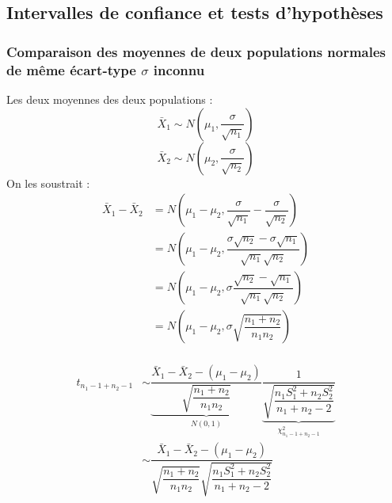 \subsection{Intervalles de confiance et tests d'hypothèses}

\subsubsection{Comparaison des moyennes de deux populations normales de même écart-type $\sigma$ inconnu}
Les deux moyennes des deux populations :
$$\bar{X}_1 \sim N \left( \mu_1, \dfrac{\sigma}{\sqrt{n_1}} \right)$$
$$\bar{X}_2 \sim N \left( \mu_2, \dfrac{\sigma}{\sqrt{n_2}} \right)$$
On les soustrait :
\begin{align*}
\bar{X}_1 - \bar{X}_2 &= N \left( \mu_1 - \mu_2, \dfrac{\sigma}{\sqrt{n_1}} - \dfrac{\sigma}{\sqrt{n_2}} \right)\\
                      &= N \left( \mu_1 - \mu_2, \dfrac{\sigma\sqrt{n_2} - \sigma\sqrt{n_1}}{\sqrt{n_1}\sqrt{n_2}} \right)\\
                      &= N \left( \mu_1 - \mu_2, \sigma\dfrac{\sqrt{n_2} - \sqrt{n_1}}{\sqrt{n_1}\sqrt{n_2}} \right)\\
                      &= N \left( \mu_1 - \mu_2, \sigma\sqrt{\dfrac{n_1 + n_2}{n_1 n_2}} \right)\\
\end{align*}

\begin{align*}
t_{n_1-1+n_2-1} &\sim \underbrace{\dfrac{\bar{X}_1 - \bar{X}_2 - (\mu_1 - \mu_2)}{\sqrt{\dfrac{n_1+n_2}{n_1n_2}}}}_{\displaystyle N(0,1)} \underbrace{\dfrac{1}{\sqrt{\dfrac{n_1S^2_1+n_2S_2^2}{n_1+n_2-2}}}}_{\displaystyle\chi_{n_1-1+n_2-1}^2}\\
   &\sim \dfrac{\bar{X}_1 - \bar{X}_2 - (\mu_1 - \mu_2)}{\sqrt{\dfrac{n_1+n_2}{n_1n_2}}\sqrt{\dfrac{n_1S^2_1+n_2S_2^2}{n_1+n_2-2}}}
\end{align*}